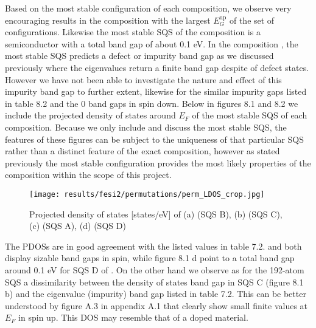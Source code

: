 Based on the most stable configuration of each composition, we observe very encouraging results in the  composition with the largest $E_G ^\text{up}$ of the set of configurations. Likewise the most stable SQS of the  composition is a semiconductor with a total band gap of about 0.1 eV. In the composition , the most stable SQS predicts a defect or impurity band gap as we discussed previously where the eigenvalues return a finite band gap despite of defect states. However we have not been able to investigate the nature and effect of this impurity band gap to further extent, likewise for the similar impurity gaps listed in table 8.2 and the 0 band gaps in spin down. Below in figures 8.1 and 8.2 we include the projected density of states around $E_F$ of the most stable SQS of each composition. Because we only include and discuss the most stable SQS, the features of these figures can be subject to the uniqueness of that particular SQS rather than a distinct feature of the exact composition, however as stated previously the most stable configuration provides the most likely properties of the composition within the scope of this project. 

\begin{figure}[H]
\texttt{[image: results/fesi2/permutations/perm\_LDOS\_crop.jpg]}
\caption{Projected density of states [states/eV] of (a)  (SQS B), (b)  (SQS C), (c)  (SQS A), (d)  (SQS D)}
\end{figure}

The PDOSs are in good agreement with the listed values in table 7.2.   and  both display sizable band gaps in spin, while figure 8.1 d point to a total band gap around 0.1 eV for SQS D of . On the other hand we observe as for the 192-atom SQS a dissimilarity between the density of states band gap in  SQS C (figure 8.1 b) and the eigenvalue (impurity) band gap listed in table 7.2. This can be better understood by figure A.3 in appendix A.1 that clearly show small finite values at $E_F$ in spin up. This DOS may resemble that of a doped material.    


